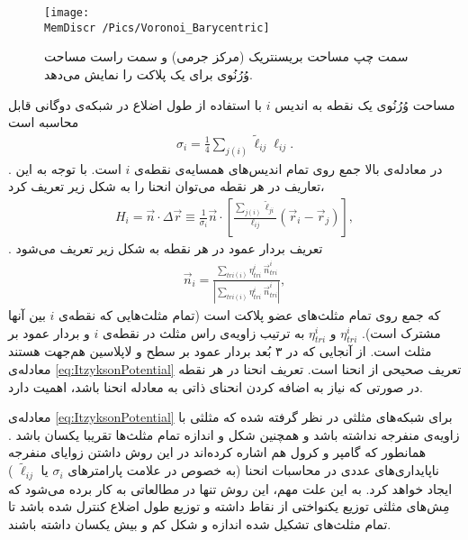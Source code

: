 \begin{figure}[htbp]
\begin{center}
\texttt{[image: \\MemDiscr /Pics/Voronoi\_Barycentric]}

\caption{
سمت چپ مساحت بریسنتریک (مرکز جرمی) و سمت راست مساحت وُرُنُوی برای یک پلاکت را نمایش می‌دهد.
}
\label{fig:voronoiBarycentric}
\end{center}
\end{figure}
مساحت وُرُنُوی
یک نقطه به اندیس 
$i$
با استفاده از طول اضلاع در شبکه‌ی دوگانی قابل محاسبه است
\begin{eqnarray}
\sigma_i=\frac{1}{4}\sum_{j(i)}\tilde\ell_{ij}\ell_{ij}.
\label{eq:voronoiArea}
\end{eqnarray}
. در معادله‌ی بالا جمع روی تمام اندیس‌های همسایه‌ی نقطه‌ی 
$i$
است. با توجه به این تعاریف در هر نقطه می‌توان انحنا را به شکل زیر تعریف کرد،
\begin{eqnarray}
H_i=\vec n\cdot\Delta \vec r\equiv\frac{1}{\sigma_i}\vec n \cdot\left[\frac{\sum_{j(i)}\tilde\ell_{ji}}{\ell_{ij}}(\vec r_i-\vec r_j)\right],
\label{eq:meanCurvatureDiscreteSingleVertex}
\end{eqnarray}
. تعریف بردار عمود در هر نقطه به شکل زیر تعریف می‌شود
\cite{Thurrner1998NormalVec}
\begin{eqnarray}
\vec n_i=\frac{\sum_{tri(i)} \eta_{tri}^i~\vec n_{tri}^i}{|\sum_{tri(i)} \eta_{tri}^i~\vec n_{tri}^i|},
\label{eq:noramlVector}
\end{eqnarray}
که جمع روی تمام مثلث‌های عضو پلاکت
است (تمام مثلث‌هایی که نقطه‌ی 
$i$
بین آنها مشترک است). 
$\eta_{tri}^i$
و
$\eta_{tri}^i$
به ترتیب زاویه‌ی راس مثلث در نقطه‌ی 
$i$
و بردار عمود بر مثلث است. از آنجایی که در ۳ بُعد بردار عمود بر سطح و لاپلاسین هم‌جهت هستند
\cite{gompper1996}
معادله‌ی 
\ref{eq:ItzyksonPotential}
تعریف صحیحی از انحنا است. تعریف انحنا در هر نقطه در صورتی که نیاز به  اضافه کردن انحنای ذاتی به معادله انحنا باشد، اهمیت دارد. 

معادله‌ی
\ref{eq:ItzyksonPotential}
برای شبکه‌های مثلثی در نظر گرفته شده که مثلثی با زاویه‌ی منفرجه نداشته باشد و همچنین شکل و اندازه تمام مثلث‌ها تقریبا یکسان باشد
\cite{Itzykson1986}.
 همانطور که گامپر و کرول هم اشاره کرده‌اند
\cite{gompper1996}
در این روش داشتن زوایای منفرجه ناپایداری‌های عددی در محاسبات انحنا (به خصوص در علامت پارامتر‌های 
$\sigma_i$
یا
$\tilde\ell_{ij}$
) ایجاد خواهد کرد. به این علت مهم، این روش تنها  در مطالعاتی به کار برده می‌شود  که مِش‌های  مثلثی  توزیع یکنواختی از نقاط داشته و توزیع طول اضلاع کنترل شده باشد تا تمام مثلث‌های تشکیل شده اندازه و شکل کم و بیش یکسان داشته باشند.



